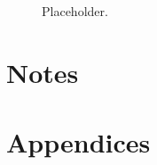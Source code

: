 \documentclass[
]{scrartcl}
\begin{document}
\begin{figure}[H]


\caption{\label{fig-management-phase}Placeholder.}

\end{figure}%

\newpage{}

\section{Notes}\label{notes}

\newpage{}

\section{Appendices}\label{sec-appendix}
\end{document}
